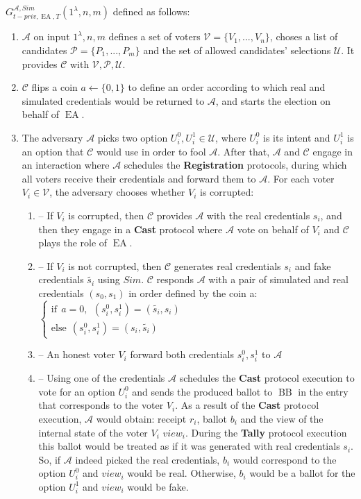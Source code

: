 \documentclass[12pt]{article}
\DeclareMathOperator{\ea}{EA}
\DeclareMathOperator{\bb}{BB}
\begin{document}
 $G_{t-priv,\ea,T}^{\mathcal{A}, Sim}(1^{\lambda},n,m)$ defined as follows:\\
\begin{enumerate}
\item $\mathcal{A}$ on input $1^{\lambda},n,m$ defines a set of voters  $\mathcal{V} = \{V_1,...,V_n\}$, choses a list of candidates  $\mathcal{P} = \{P_1,...,P_m\}$ and the set of allowed candidates' selections $\mathcal{U}$.  It provides $\mathcal{C}$ with $\mathcal{V}, \mathcal{P}, \mathcal{U}$.
\item $\mathcal{C}$ flips a coin $a \leftarrow \{0,1\}$ to define an order according to which real and simulated credentials would be returned to $\mathcal{A}$, and starts the election on behalf of $\ea$. 
\item The adversary $\mathcal{A}$ picks two option $U^0_i,U^1_i \in \mathcal{U}$, where $U^0_i$ is its intent and $U^1_i$ is an option that $\mathcal{C}$ would use in order to fool $\mathcal{A}$.  After that, $\mathcal{A}$  and $\mathcal{C}$ engage in an interaction where $\mathcal{A}$ schedules the \textbf{Registration} protocols, during which all voters receive their credentials and forward them to  $\mathcal{A}$. For each voter $V_i \in \mathcal{V}$, the adversary chooses whether $V_i$ is corrupted:
\begin{enumerate}
\item[] -- If $V_i$ is corrupted, then $\mathcal{C}$ provides $\mathcal{A}$ with the real credentials $s_i$, and then they engage in a \textbf{Cast} protocol where $\mathcal{A}$  vote on behalf of $V_i$ and  $\mathcal{C}$ plays the role of $\ea$.
\item[] --  If $V_i$ is not corrupted, then $\mathcal{C}$ generates real credentials $s_i$  and fake credentials $\tilde{s_i}$ using $Sim$.  $\mathcal{C}$  responds  $\mathcal{A}$ with a pair of simulated and real credentials $(s_0,s_1)$ in order defined by the coin a:
$ \begin{cases}
 \text{if} ~~a =0,~~ (s^0_i,s^1_i) = (\tilde{s_i},s_i)  \\ 
 \text{else}~~  (s^0_i,s^1_i) = (s_i,\tilde{s_i})
\end{cases}$
 \item[] -- An honest voter $V_i$ forward both credentials $s^0_i,s^1_i$ to $\mathcal{A}$
\item[] -- Using one of the credentials $\mathcal{A}$ schedules the \textbf{Cast} protocol execution to vote for an option $U^0_i$ and sends the produced ballot to $\bb$ in the entry that corresponds to the voter $V_i$. As a result of the \textbf{Cast} protocol execution, $\mathcal{A}$ would obtain: receipt $r_i$, ballot $b_i$ and the view of the internal state of the voter $V_i$ $view_i$.  During the \textbf{Tally} protocol execution this ballot would be treated as if it was generated with real credentials $s_i$. So, if  $\mathcal{A}$ indeed picked the real credentials, $b_i$ would correspond to the option   $U^0_i$  and $view_i$ would be real. Otherwise, $b_i$ would be a ballot for the option  $U^1_i$ and $view_i$ would be fake. 

\end{enumerate}
\end{enumerate}
\end{document}

